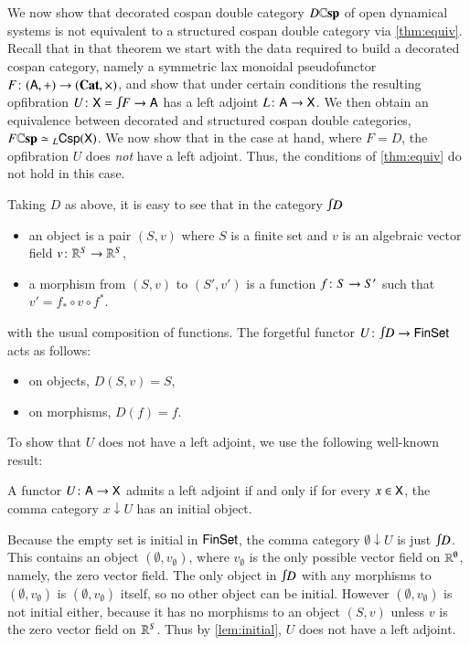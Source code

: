 \documentclass[reqno]{amsart}
\begin{document}
We now show that decorated cospan double category $D \mathbf{\mathbb Csp}$ of open dynamical systems is not equivalent to a structured cospan double category via \cref{thm:equiv}.  Recall that in that theorem we start with the data required to build a decorated cospan category, namely a symmetric lax monoidal pseudofunctor $F \colon (\mathsf{A},+) \to (\mathbf{Cat},\times)$, and show that under certain conditions the resulting opfibration $U \maps \X = \inta F \to \A$ has a left adjoint $L \colon \mathsf{A} \to \mathsf{X}$.   We then obtain an equivalence between decorated and structured cospan double categories, $F \mathbf{\mathbb Csp} \simeq {}_L \mathsf{Csp}(\mathsf{X})$.   We now show that in the case at hand, where $F = D$,  the opfibration $U$ does \emph{not} have a left adjoint.  Thus, the conditions of \cref{thm:equiv} do not hold in this case.

Taking $D$ as above, it is easy to see that in the category $\inta D$
\begin{itemize}
\item an object is a pair $(S,v)$ where $S$ is a finite set and $v$ is an algebraic vector field $v \colon \mathbb{R}^S \to \mathbb{R}^S$,
\item a morphism from $(S,v)$ to $(S',v')$ is a function $f \colon S \to S'$ such that $v' = f_* \circ v \circ f^*$.
\end{itemize}
with the usual composition of functions.   The forgetful functor $U \maps \inta D \to \Fin\Set$ acts as follows:
\begin{itemize}
\item on objects, $D(S,v) = S$,
\item on morphisms, $D(f) = f$.
\end{itemize}

To show that $U$ does not have a left adjoint, we use the following well-known result:
\begin{lem} \label{lem:initial}
A functor $U \colon \mathsf{A} \to \mathsf{X}$ admits a left adjoint if and only if for every $x \in \mathsf{X}$, the comma category $x \downarrow U$ has an initial object.
\end{lem}
Because the empty set is initial in $\mathsf{Fin}\mathsf{Set}$, the comma category 
$\emptyset \downarrow U$ is just $\inta D$.  This contains an object $(\emptyset, v_\emptyset)$, where $v_\emptyset$ is the only possible vector field on $\mathbb{R}^\emptyset$, namely, the zero vector field.   The only object in $\inta D$ with any morphisms to $(\emptyset, v_\emptyset)$ is $(\emptyset, v_\emptyset)$ itself, so no other object can be initial.  However $(\emptyset, v_\emptyset)$ is not initial either, because it has no morphisms to an object $(S,v)$ unless $v$ is the zero vector field on $\mathbb{R}^S$.  Thus by \cref{lem:initial}, $U$ does not have a left adjoint.
\end{document}
